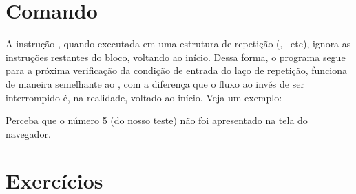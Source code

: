 \section{Comando \comandocontinue}
\label{comando-continue}

A instrução \comandocontinue, quando executada em uma estrutura de repetição (\comandofor, 
\comandowhile~etc), ignora as instruções restantes do bloco, voltando ao início. Dessa 
forma, o programa segue para a próxima verificação da condição de entrada do laço de repetição, 
funciona de maneira semelhante ao \comandobreak, com a diferença que o fluxo ao invés 
de ser interrompido é, na realidade, voltado ao início. Veja um exemplo:



Perceba que o número 5 (do nosso teste) não foi apresentado na tela do navegador.

\section{Exercícios}
\label{cap5-exercicios}

